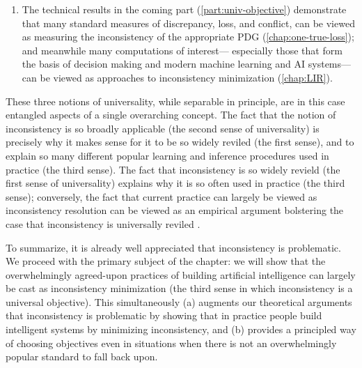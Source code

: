 {\begin{enumerate}
\item
The technical results in the coming part (\cref{part:univ-objective}) demonstrate that
many standard measures of discrepancy, loss, and conflict, can be viewed as measuring the inconsistency of the appropriate PDG (\cref{chap:one-true-loss});
and meanwhile many computations of interest---%
especially those that form the basis of decision making and modern machine learning and AI systems---%
can be viewed as approaches to inconsistency minimization
(\cref{chap:LIR}).

\end{enumerate} 


These three notions of universality, while separable in principle, are in this case entangled aspects of a single overarching concept.
The fact that the notion of inconsistency is so broadly applicable (the second sense of universality) is precisely why it makes sense for it to be so widely reviled (the first sense), and to explain so many different popular learning and inference procedures used in practice (the third sense). 
The fact that inconsistency is so widely revield (the first sense of universality) explains why it is so often used in practice (the third sense);
conversely, the fact that current practice can largely be viewed as inconsistency resolution 
 can be viewed as an empirical argument bolstering the case that inconsistency is universally reviled 
\unskip. 


To summarize, it is already well appreciated that inconsistency is problematic.
We proceed with the primary subject of the chapter: we will show that the overwhelmingly agreed-upon practices of building artificial intelligence can largely be cast as inconsistency minimization (the third sense in which inconsistency is a universal objective). 
This simultaneously (a) augments our theoretical arguments that inconsistency is problematic by showing that in practice people build intelligent systems by minimizing inconsistency, and (b) provides a principled way of choosing objectives even in situations when there is not an overwhelmingly popular standard to fall back upon.

}
